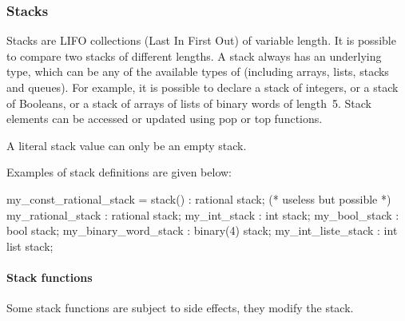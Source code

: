 \subsubsection{Stacks}

Stacks are LIFO collections (Last In First Out) of variable length.
It is possible to compare two stacks of different lengths.
A stack always has an underlying type, which can be any of the available types of \imitator{} (including arrays, lists, stacks and queues).
For example, it is possible to declare a stack of integers, or a stack of Booleans, or a stack of arrays of lists of binary words of length~5.
%
Stack elements can be accessed or updated using pop or top functions.


\begin{remark}
A literal stack value can only be an empty stack.
\end{remark}

Examples of stack definitions are given below:

\begin{IMITATORmodel}
	my_const_rational_stack = stack() : rational stack; (* useless but possible *)
	my_rational_stack			: rational stack;
	my_int_stack					: int stack;
	my_bool_stack        	: bool stack;
	my_binary_word_stack 	: binary(4) stack;
	my_int_liste_stack    : int list stack;
\end{IMITATORmodel}



\paragraph{Stack functions}

Some stack functions are subject to side effects, \ie{} they modify the stack.

